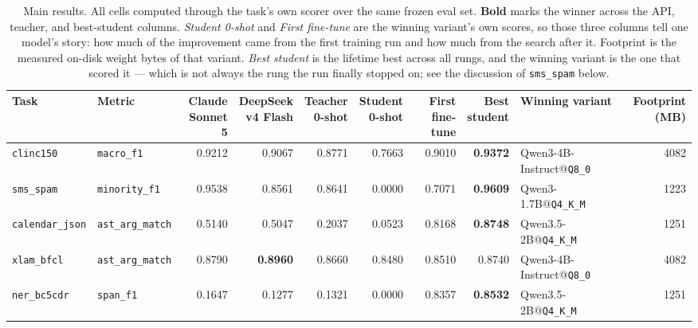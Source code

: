 \documentclass[sigconf,10pt]{acmart}
\newcommand{\tsk}[1]{\texttt{#1}}
\begin{document}
\begin{table}[t]
\centering
\small
\caption{Main results. All cells computed through the task's own scorer over the same frozen
eval set. \textbf{Bold} marks the winner across the API, teacher, and best-student columns.
\emph{Student 0-shot} and \emph{First fine-tune} are the winning variant's own scores, so
those three columns tell one model's story: how much of the improvement came from the first
training run and how much from the search after it. Footprint is the measured on-disk weight
bytes of that variant. \emph{Best student} is the lifetime best across all rungs, and the
winning variant is the one that scored it --- which is not always the rung the run finally
stopped on; see the discussion of \tsk{sms\_spam} below.}
\label{tab:main}
\footnotesize
\begin{tabular}{@{}llrrrrrrlr@{}}
\toprule
Task & Metric & \shortstack[r]{Claude\\Sonnet 5} & \shortstack[r]{DeepSeek\\v4 Flash} & \shortstack[r]{Teacher\\0-shot} & \shortstack[r]{Student\\0-shot} & \shortstack[r]{First\\fine-tune} & \shortstack[r]{Best\\student} & Winning variant & \shortstack[r]{Footprint\\(MB)} \\
\midrule
\tsk{clinc150}      & \tsk{macro\_f1}         & 0.9212 & 0.9067 & 0.8771 & 0.7663 & 0.9010 & \textbf{0.9372} & Qwen3-4B-Instruct@\texttt{Q8\_0} & 4082 \\
\tsk{sms\_spam}     & \tsk{minority\_f1}      & 0.9538 & 0.8561 & 0.8641 & 0.0000 & 0.7071 & \textbf{0.9609} & Qwen3-1.7B@\texttt{Q4\_K\_M}     & 1223 \\
\tsk{calendar\_json}& \tsk{ast\_arg\_match}   & 0.5140 & 0.5047 & 0.2037 & 0.0523 & 0.8168 & \textbf{0.8748} & Qwen3.5-2B@\texttt{Q4\_K\_M}     & 1251 \\
\tsk{xlam\_bfcl}    & \tsk{ast\_arg\_match}   & 0.8790 & \textbf{0.8960} & 0.8660 & 0.8480 & 0.8510 & 0.8740 & Qwen3-4B-Instruct@\texttt{Q8\_0} & 4082 \\
\tsk{ner\_bc5cdr}   & \tsk{span\_f1}          & 0.1647 & 0.1277 & 0.1321 & 0.0000 & 0.8357 & \textbf{0.8532} & Qwen3.5-2B@\texttt{Q4\_K\_M}     & 1251 \\

\end{tabular}
\end{table}
\end{document}
